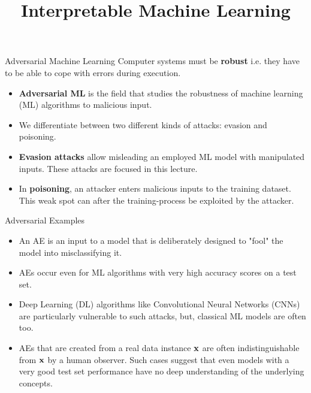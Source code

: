\documentclass[11pt,compress,t,notes=noshow, xcolor=table]{beamer}
\title{Interpretable Machine Learning}
\institute{\href{https://compstat-lmu.github.io/lecture_i2ml/}{compstat-lmu.github.io/lecture\_i2ml}}
\date{}
\begin{document}
\newcommand{\vertiii}[1]{{\left\vert\kern-0.25ex\left\vert\kern-0.25ex\left\vert #1 
    \right\vert\kern-0.25ex\right\vert\kern-0.25ex\right\vert}}








\begin{vbframe}{Adversarial Machine Learning}
Computer systems must be \textbf{robust} i.e. they have to be able to cope with errors during execution.
\begin{itemize}
\item \textbf{Adversarial ML} is the field that studies the robustness of machine learning (ML) algorithms to malicious input.
\item We differentiate between two different kinds of attacks: evasion and poisoning.
\item \textbf{Evasion attacks} allow misleading an employed ML model with manipulated inputs. These attacks are focused in this lecture.
\item In \textbf{poisoning}, an attacker enters malicious inputs to the training dataset. This weak spot can after the training-process be exploited by the attacker.
\end{itemize}
\end{vbframe}

\begin{vbframe}{Adversarial Examples}
\begin{itemize}
\item An AE is an input to a model that is deliberately designed to "fool" the model into misclassifying it.
\item AEs occur even for ML algorithms with very high accuracy scores on a test set.
\item Deep Learning (DL) algorithms like Convolutional Neural Networks (CNNs) are particularly vulnerable to such attacks, but, classical ML models are often too.
\item AEs that are created from a real data instance $\xv$ are often indistinguishable from $\xv$ by a human observer. Such cases suggest that even models with a very good test set performance have no deep understanding of the underlying concepts.%
\end{itemize}
\end{vbframe}
\end{document}
